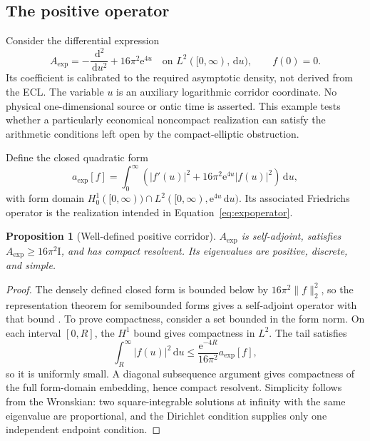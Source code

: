 \documentclass[11pt,letterpaper]{article}
\numberwithin{equation}{section}
\newtheorem{proposition}[theorem]{Proposition}
\theoremstyle{definition}
\theoremstyle{remark}
\newcommand{\Id}{\mathrm I}
\newcommand{\dd}{\,\mathrm d}
\newcommand{\e}{\mathrm e}
\begin{document}
\subsection{The positive operator}
Consider the differential expression
\begin{equation}
 A_{\mathrm{exp}}=-\frac{\dd^2}{\dd u^2}+16\pi^2\e^{4u}
 \quad\text{on }L^2([0,\infty),\dd u),\qquad f(0)=0.
 \label{eq:expoperator}
\end{equation}
Its coefficient is calibrated to the required asymptotic density, not derived from the ECL. The variable $u$ is an auxiliary logarithmic corridor coordinate. No physical one-dimensional source or ontic time is asserted. This example tests whether a particularly economical noncompact realization can satisfy the arithmetic conditions left open by the compact-elliptic obstruction.

Define the closed quadratic form
\begin{equation}
 a_{\mathrm{exp}}[f]=\int_0^\infty
 \left(|f'(u)|^2+16\pi^2\e^{4u}|f(u)|^2\right)\dd u,
 \label{eq:expform}
\end{equation}
with form domain $H_0^1([0,\infty))\cap L^2([0,\infty),\e^{4u}\dd u)$. Its associated Friedrichs operator is the realization intended in Equation~\eqref{eq:expoperator}.

\begin{proposition}[Well-defined positive corridor]
\label{prop:exppositive}
$A_{\mathrm{exp}}$ is self-adjoint, satisfies $A_{\mathrm{exp}}\geq16\pi^2\Id$, and has compact resolvent. Its eigenvalues are positive, discrete, and simple.
\end{proposition}
\begin{proof}
The densely defined closed form is bounded below by $16\pi^2\|f\|_2^2$, so the representation theorem for semibounded forms gives a self-adjoint operator with that bound \cite{reed}. To prove compactness, consider a set bounded in the form norm. On each interval $[0,R]$, the $H^1$ bound gives compactness in $L^2$. The tail satisfies
\[
 \int_R^\infty|f(u)|^2\dd u
 \leq\frac{\e^{-4R}}{16\pi^2}a_{\mathrm{exp}}[f],
\]
so it is uniformly small. A diagonal subsequence argument gives compactness of the full form-domain embedding, hence compact resolvent. Simplicity follows from the Wronskian: two square-integrable solutions at infinity with the same eigenvalue are proportional, and the Dirichlet condition supplies only one independent endpoint condition.
\end{proof}
\end{document}
